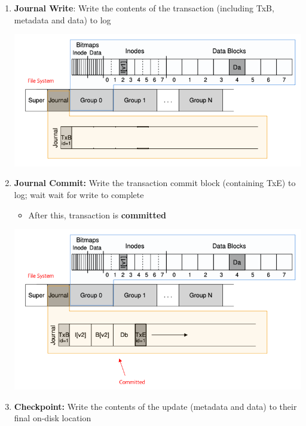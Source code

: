 \documentclass[12pt]{article}
\begin{document}
\begin{enumerate}[1.]
\begin{enumerate}[a)]
\begin{itemize}
\begin{itemize}
                \begin{enumerate}[1.]
                    \item \textbf{Journal Write}: Write the contents of the transaction (including TxB, metadata and data)
                    to log

                    \begin{center}
                    \includegraphics[width=0.8\linewidth]{../images/midterm_4_solution_36.png}
                    \end{center}

                    \item \textbf{Journal Commit:} Write the transaction commit block (containing TxE) to log; wait wait for write to complete
                    \begin{itemize}
                        \item After this, transaction is \textbf{committed}
                    \end{itemize}

                    \begin{center}
                    \includegraphics[width=0.8\linewidth]{../images/midterm_4_solution_37.png}
                    \end{center}

                    \item \textbf{Checkpoint:} Write the contents of the update (metadata and data) to their final on-disk location


\end{enumerate}
\end{itemize}
\end{itemize}
\end{enumerate}
\end{enumerate}
\end{document}
